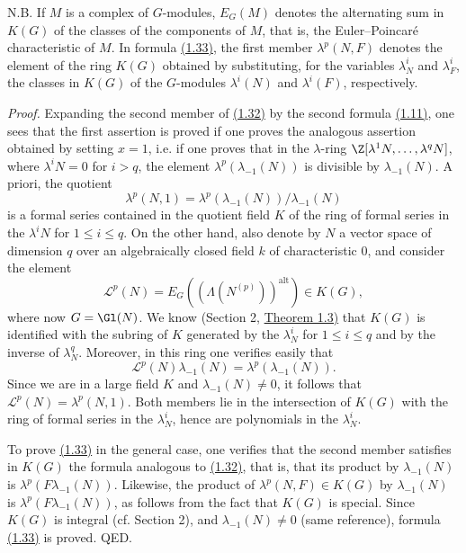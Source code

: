 N.B. If $M$ is a complex of $G$-modules, $E_G(M)$ denotes the alternating sum in $K(G)$ of the classes of the components of $M$, that is, the Euler--Poincaré characteristic of $M$. In formula \hyperlink{sga6.e00.eq.1-33}{(1.33)}, the first member $\lambda^p(N,F)$ denotes the element of the ring $K(G)$ obtained by substituting, for the variables $\lambda^i_N$ and $\lambda^i_F$, the classes in $K(G)$ of the $G$-modules $\lambda^i(N)$ and $\lambda^i(F)$, respectively.

\emph{Proof.} Expanding the second member of \hyperlink{sga6.e00.eq.1-32}{(1.32)} by the second formula \hyperlink{sga6.e00.eq.1-11}{(1.11)}, one sees that the first assertion is proved if one proves the analogous assertion obtained by setting $x=1$, i.e. if one proves that in the $\lambda$-ring $\Z[\lambda^1N,\ldots,\lambda^qN]$, where $\lambda^iN=0$ for $i>q$, the element $\lambda^p(\lambda_{-1}(N))$ is divisible by $\lambda_{-1}(N)$. A priori, the quotient
\[
\lambda^p(N,1)=\lambda^p(\lambda_{-1}(N))/\lambda_{-1}(N)
\]
is a formal series contained in the quotient field $K$ of the ring of formal series in the $\lambda^iN$ for $1\leq i\leq q$. On the other hand, also denote by $N$ a vector space of dimension $q$ over an algebraically closed field $k$ of characteristic $0$, and consider the element
\[
\mathscr L^p(N)=E_G((\Lambda(N^{(p)}))^{\mathrm{alt}})\in K(G),
\]
where now $G=\Gl(N)$. We know (Section 2, \hyperlink{sga6.e00.thm.1-1}{Theorem 1.3)} that $K(G)$ is identified with the subring of $K$ generated by the $\lambda^i_N$ for $1\leq i\leq q$ and by the inverse of $\lambda_N^q$. Moreover, in this ring one verifies easily that
\[
\mathscr L^p(N)\lambda_{-1}(N)=\lambda^p(\lambda_{-1}(N)).
\]
Since we are in a large field $K$ and $\lambda_{-1}(N)\neq 0$, it follows that $\mathscr L^p(N)=\lambda^p(N,1)$. Both members lie in the intersection of $K(G)$ with the ring of formal series in the $\lambda_N^i$, hence are polynomials in the $\lambda_N^i$.

To prove \hyperlink{sga6.e00.eq.1-33}{(1.33)} in the general case, one verifies that the second member satisfies in $K(G)$ the formula analogous to \hyperlink{sga6.e00.eq.1-32}{(1.32)}, that is, that its product by $\lambda_{-1}(N)$ is $\lambda^p(F\lambda_{-1}(N))$. Likewise, the product of $\lambda^p(N,F)\in K(G)$ by $\lambda_{-1}(N)$ is $\lambda^p(F\lambda_{-1}(N))$, as follows from the fact that $K(G)$ is special. Since $K(G)$ is integral (cf. Section 2), and $\lambda_{-1}(N)\neq 0$ (same reference), formula \hyperlink{sga6.e00.eq.1-33}{(1.33)} is proved. QED.

